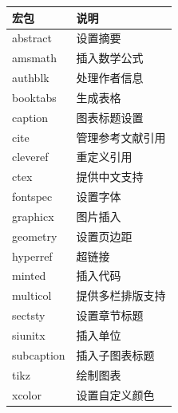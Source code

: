 \documentclass[a4paper]{article}
\begin{document}
\begin{center}
    \begin{tabular}{|m{}|m{}|}
        \hline
        宏包 & 说明 \\
        \hline
        abstract & 设置摘要 \\
        amsmath & 插入数学公式 \\
        authblk & 处理作者信息 \\
        booktabs & 生成表格 \\
        caption & 图表标题设置 \\
        cite & 管理参考文献引用 \\
        cleveref & 重定义引用 \\
        ctex & 提供中文支持 \\
        fontspec & 设置字体 \\
        graphicx & 图片插入 \\
        geometry & 设置页边距 \\
        hyperref & 超链接 \\
        minted & 插入代码 \\
        multicol & 提供多栏排版支持 \\
        sectsty & 设置章节标题 \\
        siunitx & 插入单位 \\
        subcaption & 插入子图表标题 \\
        tikz & 绘制图表 \\
        xcolor & 设置自定义颜色 \\
        \hline
    \end{tabular}
\end{center}
\end{document}
